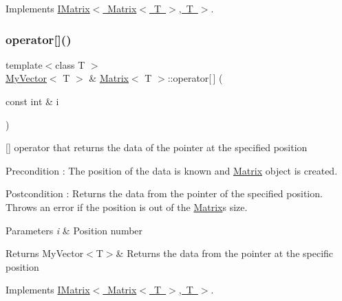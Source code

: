 Implements \mbox{\hyperlink{class_i_matrix_a9eeb68de7e1d37d1aab439c78fea9be3}{I\+Matrix$<$ Matrix$<$ T $>$, T $>$}}.

\mbox{\label{class_matrix_aa9532c87a69bef256954e2309ca3fdd6}} 
\subsubsection{\texorpdfstring{operator[]()}{operator[]()}\hspace{0.1cm}{\footnotesize\ttfamily [1/2]}}
{\footnotesize\ttfamily template$<$class T $>$ \\
\mbox{\hyperlink{class_my_vector}{My\+Vector}}$<$ T $>$ \& \mbox{\hyperlink{class_matrix}{Matrix}}$<$ T $>$\+::operator\mbox{[}$\,$\mbox{]} (\begin{DoxyParamCaption}\item[{const int \&}]{i }\end{DoxyParamCaption})\hspace{0.3cm}{\ttfamily [virtual]}}



\mbox{[}\mbox{]} operator that returns the data of the pointer at the specified position 

\begin{DoxyPrecond}{Precondition}
\+: The position of the data is known and \mbox{\hyperlink{class_matrix}{Matrix}} object is created. 
\end{DoxyPrecond}
\begin{DoxyPostcond}{Postcondition}
\+: Returns the data from the pointer of the specified position. Throws an error if the position is out of the \mbox{\hyperlink{class_matrix}{Matrix}}\textquotesingle{}s size. 
\end{DoxyPostcond}

\begin{DoxyParams}{Parameters}
{\em i} & Position number \\
\hline
\end{DoxyParams}
\begin{DoxyReturn}{Returns}
My\+Vector$<$\+T$>$\& Returns the data from the pointer at the specific position 
\end{DoxyReturn}


Implements \mbox{\hyperlink{class_i_matrix_a3cfb2490e2849c6c19c1979066a64818}{I\+Matrix$<$ Matrix$<$ T $>$, T $>$}}.

